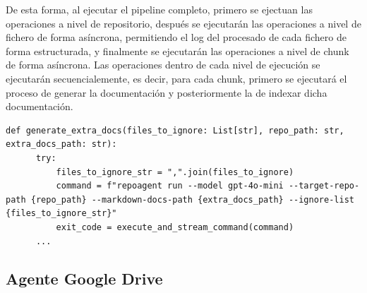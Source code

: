 De esta forma, al ejecutar el pipeline completo, primero se ejectuan las operaciones a nivel de repositorio, después se ejecutarán las operaciones a nivel de fichero de forma asíncrona, permitiendo el log del procesado de cada fichero de forma estructurada, y finalmente se ejecutarán las operaciones a nivel de chunk de forma asíncrona. Las operaciones dentro de cada nivel de ejecución se ejecutarán secuencialemente, es decir, para cada chunk, primero se ejecutará el proceso de generar la documentación y posteriormente la de indexar dicha documentación. 


\begin{lstlisting}[caption={\protect\opus{generate_extra_docs}: Ejecución de agente RepoAgent para crear la documentación API}, label={lst:spec_graph}]
  def generate_extra_docs(files_to_ignore: List[str], repo_path: str, extra_docs_path: str):
      try:
          files_to_ignore_str = ",".join(files_to_ignore)
          command = f"repoagent run --model gpt-4o-mini --target-repo-path {repo_path} --markdown-docs-path {extra_docs_path} --ignore-list {files_to_ignore_str}"
          exit_code = execute_and_stream_command(command)
      ...
\end{lstlisting}

\subsection{Agente Google Drive}














